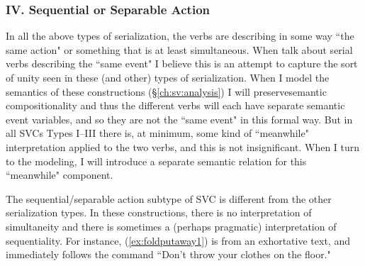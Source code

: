 \begin{comment}
\ex~ \label{ex:talkabout}
\begingl
\glpreamble ʔuḥʔaƛiič n̓uw̓iiqskqs \textbf{ʔuumac̓kʷ} \textbf{ʔiiqḥuk} ʔumʔiiqskqs. //
\gla ʔuḥ=ʔaƛ=(y)ii=č n̓uw̓iiqsu=ʔak=qaˑs \textbf{ʔu-L.mac̓uk} \textbf{ʔiiqḥ-uk} ʔumʔiiqsu=ʔak=qaˑs //
\glb be=\textsc{now}=\textsc{weak.3}=\textsc{hrsy} father=\textsc{poss}=\textsc{defn.1sg} \textbf{talk.about} \textbf{tell-\textsc{dr}} mother=\textsc{poss}=\textsc{defn.1sg} //
\glft `It was my father who told my mother about it.' (\textbf{Q}, Sophie Billy) //
\endgl
\xe

Like the other SVCs, the transitive verb can be separated from its object.


\end{comment}

\subsubsection{IV. Sequential or Separable Action} \label{ch:sv:data:type4}

\vspace{10pt}

In all the above types of serialization, the verbs are describing in some way ``the same action" or something that is at least simultaneous. When \cite{aikhenvalddixon2006} talk about serial verbs describing the ``same event" I believe this is an attempt to capture the sort of unity seen in these (and other) types of serialization. When I model the semantics of these constructions (\S\ref{ch:sv:analysis}) I will preservesemantic compositionality and thus the different verbs will each have separate semantic event variables, and so they are not the ``same event" in this formal way. But in all SVCs Types I--III there is, at minimum, some kind of ``meanwhile" interpretation applied to the two verbs, and this is not insignificant. When I turn to the modeling, I will introduce a separate semantic relation for this ``meanwhile" component.

The sequential/separable action subtype of SVC is different from the other serialization types. In these constructions, there is no interpretation of simultaneity and there is sometimes a (perhaps pragmatic) interpretation of sequentiality. For instance, (\ref{ex:foldputaway1}) is from an exhortative text, and immediately follows the command ``Don't throw your clothes on the floor."

